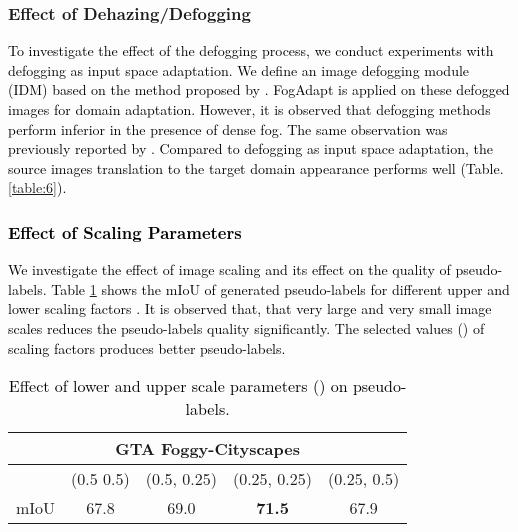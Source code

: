 \documentclass[final,5p,times,twocolumn]{elsarticle}
\begin{document}
\subsubsection{Effect of Dehazing/Defogging}
\textcolor{black}{
To investigate the effect of the defogging process, we conduct experiments with defogging as input space adaptation. We define an image defogging module (IDM) based on the method proposed by \cite{chen2019gated}. FogAdapt is applied on these defogged images for domain adaptation. 
However, it is observed that defogging methods perform inferior in the presence of dense fog. The same observation was previously reported by \cite{dai2019curriculum}. Compared to defogging as input space adaptation, the source images translation to the target domain appearance performs well (Table. \ref{table:6}).}
\begin{table}[H]
\footnotesize
\centering
\caption{A comparative analysis of image transformation methods in dense foggy scenes adaptation process.}
\label{table:6}
\vspace{-0.3cm}
\end{table}

\textcolor{black}{
\subsubsection{Effect of Scaling Parameters }
\label{sec:ablation-sc}
We investigate the effect of image scaling and its effect on the quality of pseudo-labels. Table \ref{table:ablation-sc} shows the mIoU of generated pseudo-labels for different upper and lower scaling factors . It is observed that, that very large and very small image scales reduces the pseudo-labels quality significantly. The selected values () of scaling factors produces better pseudo-labels.
\begin{table}[H]
\footnotesize
\centering
\caption{\textcolor{black}{Effect of lower and upper scale parameters () on pseudo-labels.}}
{\color{black}\begin{tabular}{c|cccc}
\hline
\multicolumn{5}{c}{GTA  Foggy-Cityscapes} \\
\hline
& (0.5 0.5)  & (0.5, 0.25)   & (0.25, 0.25)    & (0.25, 0.5)   \\
\hline
mIoU& 67.8  & 69.0   & \textbf{71.5}    & 67.9   \\
\hline
\end{tabular}}
\label{table:ablation-sc}
\end{table}
}
\end{document}
